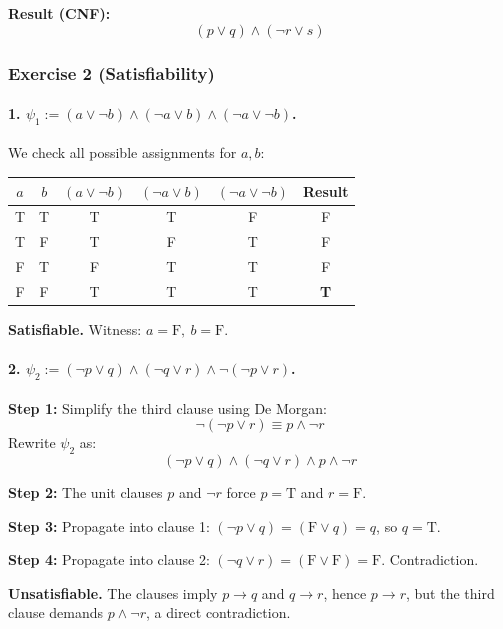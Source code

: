 \documentclass{article}
\theoremstyle{theorem}
\theoremstyle{definition}
\theoremstyle{remark}
\begin{document}
\textbf{Result (CNF):}
\[
(p \lor q) \land (\neg r \lor s)
\]

\subsubsection*{Exercise 2 (Satisfiability)}

\paragraph{1. $\psi_1 := (a \lor \neg b) \land (\neg a \lor b) \land (\neg a \lor \neg b)$.}

We check all possible assignments for $a, b$:

\begin{center}
\begin{tabular}{cc|ccc|c}
$a$ & $b$ & $(a \lor \neg b)$ & $(\neg a \lor b)$ & $(\neg a \lor \neg b)$ & Result \\
\hline
T & T & T & T & F & F \\
T & F & T & F & T & F \\
F & T & F & T & T & F \\
F & F & T & T & T & \textbf{T} \\
\end{tabular}
\end{center}

\textbf{Satisfiable.} Witness: $a = \text{F},\ b = \text{F}$.

\paragraph{2. $\psi_2 := (\neg p \lor q) \land (\neg q \lor r) \land \neg(\neg p \lor r)$.}

\textbf{Step 1:} Simplify the third clause using De Morgan:
\[
\neg(\neg p \lor r) \equiv p \land \neg r
\]
Rewrite $\psi_2$ as:
\[
(\neg p \lor q) \land (\neg q \lor r) \land p \land \neg r
\]

\textbf{Step 2:} The unit clauses $p$ and $\neg r$ force $p = \text{T}$ and $r = \text{F}$.

\textbf{Step 3:} Propagate into clause 1: $(\neg p \lor q) = (\text{F} \lor q) = q$, so $q = \text{T}$.

\textbf{Step 4:} Propagate into clause 2: $(\neg q \lor r) = (\text{F} \lor \text{F}) = \text{F}$. Contradiction.

\textbf{Unsatisfiable.} The clauses imply $p \to q$ and $q \to r$, hence $p \to r$, but the third clause demands $p \land \neg r$, a direct contradiction.
\end{document}
